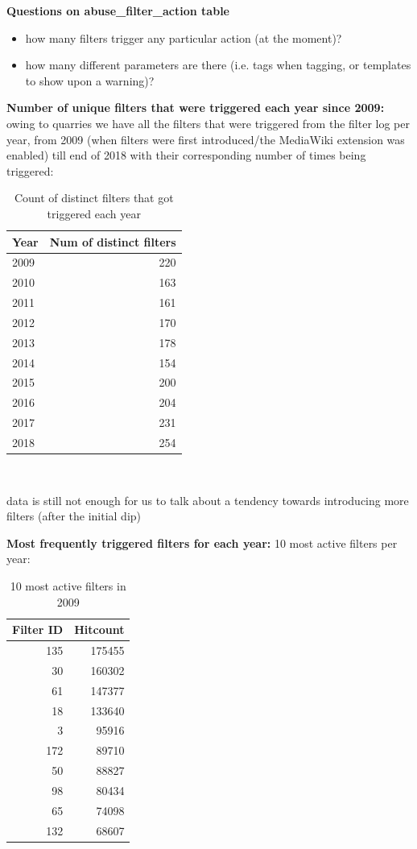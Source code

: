 \documentclass{sigchi}
\begin{document}
\textbf{Questions on abuse\_filter\_action table}
\begin{itemize}
    \item how many filters trigger any particular action (at the moment)?
    \item how many different parameters are there (i.e. tags when tagging, or templates to show upon a warning)?
\end{itemize}

\textbf{Number of unique filters that were triggered each year since 2009:}
owing to quarries we have all the filters that were triggered from the filter log per year, from 2009 (when filters were first introduced/the MediaWiki extension was enabled) till end of 2018 with their corresponding number of times being triggered:
\begin{table}
  \centering
  \begin{tabular}{l r }
    Year & Num of distinct filters \\
    \hline
    2009 & 220 \\
    2010 & 163 \\
    2011 & 161 \\
    2012 & 170 \\
    2013 & 178 \\
    2014 & 154 \\
    2015 & 200 \\
    2016 & 204 \\
    2017 & 231 \\
    2018 & 254 \\
  \end{tabular}
  \caption{Count of distinct filters that got triggered each year}~\label{tab:active-filters-count}
\end{table}

data is still not enough for us to talk about a tendency towards introducing more filters (after the initial dip)


\textbf{Most frequently triggered filters for each year:}
10 most active filters per year:
\begin{table}
  \centering
  \begin{tabular}{r r }
    Filter ID & Hitcount \\
    \hline
    135 & 175455 \\
    30 & 160302 \\
    61 & 147377 \\
    18 & 133640 \\
    3 & 95916 \\
    172 & 89710 \\
    50 & 88827 \\
    98 & 80434 \\
    65 & 74098 \\
    132 & 68607 \\
  \end{tabular}
  \caption{10 most active filters in 2009}~\label{tab:most-active-2009}
\end{table}
\end{document}
